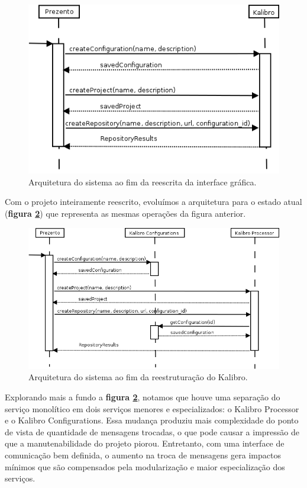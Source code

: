 \documentclass{llncs}
\begin{document}
  \begin{figure}[H]
    \centering
    \includegraphics[width=\textwidth]{images/prev_processing_seq_diag.png}
    \caption{Arquitetura do sistema ao fim da reescrita da interface gráfica.}
    \label{fig:architecture-1}
  \end{figure}

  Com o projeto inteiramente reescrito, evoluímos a arquitetura para o estado atual (\textbf{figura \ref{fig:architecture-2}}) que representa as mesmas operações da figura anterior.

  \begin{figure}[H]
    \centering
      \includegraphics[width=\textwidth]{images/processing_seq_diag.png}
    \caption{Arquitetura do sistema ao fim da reestruturação do Kalibro.}
    \label{fig:architecture-2}
  \end{figure}

  Explorando mais a fundo a \textbf{figura \ref{fig:architecture-2}}, notamos que houve uma separação do serviço monolítico em dois serviços menores e especializados: o Kalibro Processor e o Kalibro Configurations. Essa mudança produziu mais complexidade do ponto de vista de quantidade de mensagens trocadas, o que pode causar a impressão de que a manutenabilidade do projeto piorou. Entretanto, com uma interface de comunicação bem definida, o aumento na troca de mensagens gera impactos mínimos que são compensados pela modularização e maior especialização dos serviços.
\end{document}
